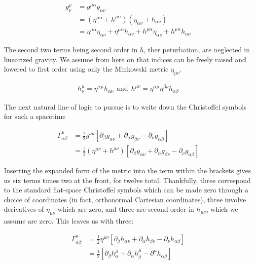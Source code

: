 \documentclass[paper=a4, fontsize=11pt]{scrartcl} %
\numberwithin{equation}{section} %
\numberwithin{figure}{section} %
\numberwithin{table}{section} %
\begin{document}
\begin{align}
g^{\mu}_{\nu} &= g^{\mu \alpha}g_{\alpha \nu} \\
&= (\eta^{\mu \alpha} + h^{\mu \alpha}) (\eta_{\alpha \nu} + h_{\alpha \nu}) \\
&= \eta^{\mu \alpha}\eta_{\alpha \nu} + \eta^{\mu \alpha}h_{\alpha \nu} + h^{\mu \alpha}\eta_{\alpha \nu} + h^{\mu \alpha}h_{\alpha \nu}
\end{align} 

The second two terms being second order in $h$, ther peturbation, are neglected in linearized gravity. We assume from here on that indices can be freely raised and lowered to first order using only the Minkowski metric $\eta_{\mu \nu}$.

\begin{align}
h^\mu_\nu = \eta^{\alpha \mu} h_{\alpha \nu} \ \  \text{and} \ \ h^{\mu \nu} = \eta^{\alpha \mu}\eta^{\beta \nu}h_{\alpha \beta}
\end{align}

The next natural line of logic to pursue is to write down the Christoffel symbols for such a spacetime

\begin{align}
\Gamma^{\mu}_{\alpha \beta} &= \frac{1}{2}g^{\nu \mu}\left[\partial_{\beta}g_{\alpha \nu} + \partial_{\alpha}g_{\beta \nu} - \partial_{\nu}g_{\alpha \beta}\right] \\
&= \frac{1}{2}\left(\eta^{\mu \nu} + h^{\mu \nu}\right)\left[\partial_{\beta}g_{\alpha \nu} + \partial_{\alpha}g_{\beta \nu} - \partial_{\nu}g_{\alpha \beta}\right]
\end{align}

Inserting the expanded form of the metric into the term within the brackets gives us six terms times two at the front, for twelve total. Thankfully, three correspond to the standard flat-space Christoffel symbols which can be made zero through a choice of coordinates (in fact, orthonormal Cartesian coordinates), three involve derivatives of $\eta_{\mu \nu}$ which are zero, and three are second order in $h_{\mu \nu}$, which we assume are zero. This leaves us with three:

\begin{align}
\Gamma^{\mu}_{\alpha \beta} &= \frac{1}{2}\eta^{\mu \nu}\left[\partial_{\beta}h_{\alpha \nu} + \partial_{\alpha} h_{\beta \nu} - \partial_{\nu}h_{\alpha \beta}\right] \\
&= \frac{1}{2} \left[\partial_{\beta} h^{\mu}_{\alpha} + \partial_{\alpha}h_{\beta}^{\mu} - \partial^{\mu}h_{\alpha \beta}\right] 
\end{align} 
\end{document}
